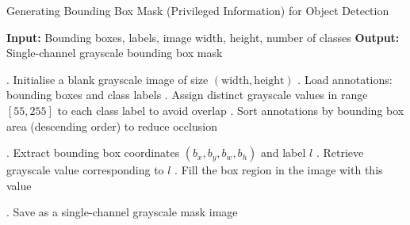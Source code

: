         
        
\begin{algorithm}
    \caption{Generating Bounding Box Mask (Privileged Information) for Object Detection}
    \label{alg:boundingBoxMask}
    \begin{algorithmic}
        \State \textbf{Input:} Bounding boxes, labels, image width, height, number of classes
        \State \textbf{Output:} Single-channel grayscale bounding box mask
        
        . Initialise a blank grayscale image of size \( (\text{width}, \text{height}) \)
        . Load annotations: bounding boxes and class labels
        . Assign distinct grayscale values in range $[55, 255]$ to each class label to avoid overlap
        . Sort annotations by bounding box area (descending order) to reduce occlusion
        
            . Extract bounding box coordinates \( (b_x, b_y, b_w, b_h) \) and label \( l \)
            . Retrieve grayscale value corresponding to \( l \)
            . Fill the box region in the image with this value
        \EndFor
        
        . Save as a single-channel grayscale mask image
    \end{algorithmic}
\end{algorithm}


